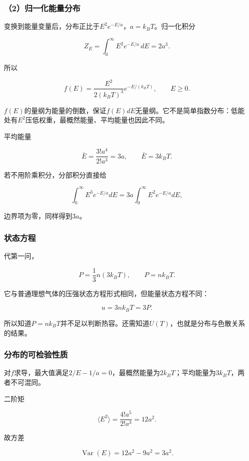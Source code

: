\documentclass[12pt,a4paper,fontset=fandol]{ctexart}
\begin{document}
\subsubsection{（2）归一化能量分布}\label{ux5f52ux4e00ux5316ux80fdux91cfux5206ux5e03}

变换到能量变量后，分布正比于\(E^2e^{-E/a}\)，\(a=k_BT\)。归一化积分

\[
Z_E=\int_0^\infty E^2e^{-E/a}\,dE=2a^3.
\]

所以

\[
\boxed{f(E)=\frac{E^2}{2(k_BT)^3}e^{-E/(k_BT)}},
\qquad E\geq0.
\]

\(f(E)\)的量纲为能量的倒数，保证\(f(E)dE\)无量纲。它不是简单指数分布：低能处有\(E^2\)压低权重，最概然能量、平均能量也因此不同。

平均能量

\[
\bar E=
\frac{3!a^4}{2!a^3}
=3a,
\qquad \boxed{\bar E=3k_BT}.
\]

若不用阶乘积分，分部积分直接给

\[
\int_0^\infty E^3e^{-E/a}dE
=3a\int_0^\infty E^2e^{-E/a}dE,
\]

边界项为零，同样得到\(3a\)。

\subsubsection{状态方程}\label{ux72b6ux6001ux65b9ux7a0b}

代第一问，

\[
P=\frac13n(3k_BT),
\qquad \boxed{P=nk_BT}.
\]

它与普通理想气体的压强状态方程形式相同，但能量状态方程不同：

\[
\boxed{u=3nk_BT=3P}.
\]

所以知道\(P=nk_BT\)并不足以判断热容。还需知道\(U(T)\)，也就是分布与色散关系的结果。

\subsubsection{分布的可检验性质}\label{ux5206ux5e03ux7684ux53efux68c0ux9a8cux6027ux8d28}

对\(f\)求导，最大值满足\(2/E-1/a=0\)，最概然能量为\(2k_BT\)；平均能量为\(3k_BT\)，两者不可混同。

二阶矩

\[
\langle E^2\rangle
=\frac{4!a^5}{2!a^3}=12a^2.
\]

故方差

\[
\operatorname{Var}(E)=12a^2-9a^2=3a^2.
\]
\end{document}
